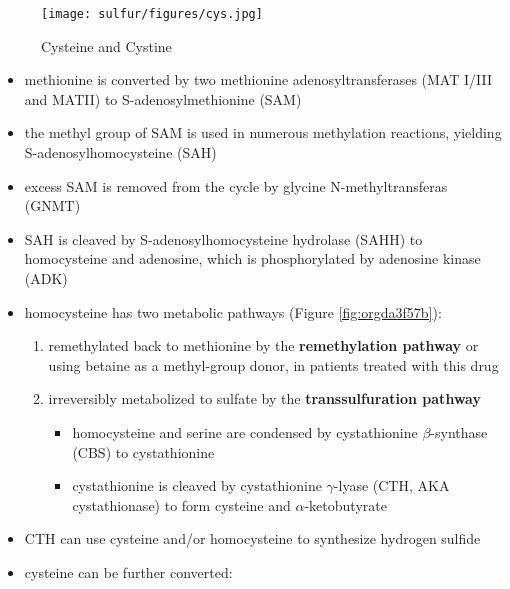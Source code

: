 \documentclass[12pt]{scrartcl}
\begin{document}
\begin{center}
\begin{center}
\begin{center}
\chemnameinit{}
\chemnameinit{}
\hspace{20}
\chemnameinit{}
\hspace{20}
\end{center}


\begin{figure}[htbp]
\centering
\texttt{[image: sulfur/figures/cys.jpg]}
\caption{\label{fig:org5bfb004}Cysteine and Cystine}
\end{figure}

\begin{itemize}
\item methionine is converted by two methionine adenosyltransferases (MAT
I/III and MATII) to S-adenosylmethionine (SAM)
\item the methyl group of SAM is used in numerous methylation reactions,
yielding S-adenosylhomocysteine (SAH)
\item excess SAM is removed from the cycle by glycine N-methyltransferas (GNMT)
\item SAH is cleaved by S-adenosylhomocysteine hydrolase (SAHH) to
homocysteine and adenosine, which is phosphorylated by adenosine
kinase (ADK)
\item homocysteine has two metabolic pathways (Figure \ref{fig:orgda3f57b}):
\begin{enumerate}
\item remethylated back to methionine by the \textbf{remethylation pathway} or
using betaine as a methyl-group donor, in patients treated with
this drug
\item irreversibly metabolized to sulfate
by the \textbf{transsulfuration pathway}
\begin{itemize}
\item homocysteine and serine are condensed by cystathionine
\(\beta\)-synthase (CBS) to cystathionine
\item cystathionine is cleaved by cystathionine \(\gamma\)-lyase (CTH, AKA cystathionase) to
form cysteine and \(\alpha\)-ketobutyrate
\end{itemize}
\end{enumerate}
\item CTH can use cysteine and/or homocysteine to synthesize hydrogen
sulfide
\item cysteine can be further converted:

\end{itemize}
\end{center}
\end{center}
\end{document}
